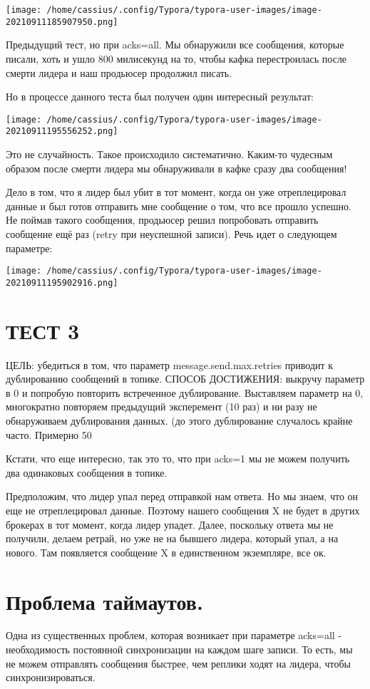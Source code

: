 \documentclass[11pt]{article}
\begin{document}
    \texttt{[image: /home/cassius/.config/Typora/typora-user-images/image-20210911185907950.png]}

    Предыдущий тест, но при acks=all. Мы обнаружили все сообщения, которые писали, хоть и ушло 800 милисекунд на то, чтобы кафка перестроилась после смерти лидера и наш продьюсер продолжил писать.

    Но в процессе данного теста был получен один интересный результат:

    \texttt{[image: /home/cassius/.config/Typora/typora-user-images/image-20210911195556252.png]}

    Это не случайность. Такое происходило систематично. Каким-то чудесным образом после смерти лидера мы обнаруживали в
    кафке сразу два сообщения!

    Дело в том, что я лидер был убит в тот момент, когда он уже отреплецировал данные и был готов
    отправить мне сообщение о том, что все прошло успешно. Не поймав такого сообщения, продьюсер решил попробовать
    отправить сообщение ещё раз (retry при неуспешной записи). Речь идет о следующем параметре:

    \texttt{[image: /home/cassius/.config/Typora/typora-user-images/image-20210911195902916.png]}
    
    \section{ТЕСТ 3}
    ЦЕЛЬ: убедиться в том, что параметр message.send.max.retries приводит к дублированию сообщений в топике.
    СПОСОБ ДОСТИЖЕНИЯ: выкручу параметр в 0 и попробую повторить встреченное дублирование.
    Выставляем параметр на 0, многократно повторяем предыдущий эксперемент (10 раз) и ни разу не обнаруживаем
    дублирования данных. (до этого дублирование случалось крайне часто. Примерно 50%

    Кстати, что еще интересно, так это то, что при acks=1 мы не можем получить два одинаковых сообщения в топике.

    Предположим, что лидер упал перед отправкой нам ответа. Но мы знаем, что он еще не отреплецировал данные. Поэтому нашего сообщения X не будет в других брокерах в тот момент, когда лидер упадет. Далее, поскольку ответа мы не получили, делаем ретрай, но уже не на бывшего лидера, который упал, а на нового. Там появляется сообщение X в единственном  экземпляре, все ок.

    \section{Проблема таймаутов.}
    Одна из существенных проблем, которая возникает при параметре acks=all - необходимость постоянной синхронизации
    на каждом шаге записи. То есть, мы не можем отправлять сообщения быстрее, чем реплики ходят на лидера, чтобы
    синхронизироваться.
\end{document}
